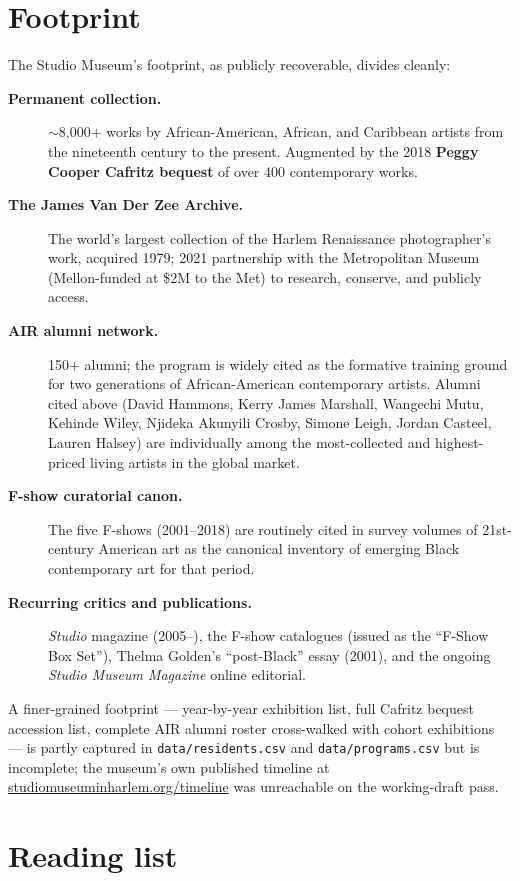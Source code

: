 \documentclass[10pt,letterpaper,twocolumn]{article}
\begin{document}
\section{Footprint}

The Studio Museum's footprint, as publicly recoverable, divides cleanly:

\begin{description}
\item[\textbf{Permanent collection.}] $\sim$8{,}000+ works by African-American, African, and Caribbean artists from the nineteenth century to the present. Augmented by the 2018 \textbf{Peggy Cooper Cafritz bequest} of over 400 contemporary works.
\item[\textbf{The James Van Der Zee Archive.}] The world's largest collection of the Harlem Renaissance photographer's work, acquired 1979; 2021 partnership with the Metropolitan Museum (Mellon-funded at \$2M to the Met) to research, conserve, and publicly access.
\item[\textbf{AIR alumni network.}] 150+ alumni; the program is widely cited as the formative training ground for two generations of African-American contemporary artists. Alumni cited above (David Hammons, Kerry James Marshall, Wangechi Mutu, Kehinde Wiley, Njideka Akunyili Crosby, Simone Leigh, Jordan Casteel, Lauren Halsey) are individually among the most-collected and highest-priced living artists in the global market.
\item[\textbf{F-show curatorial canon.}] The five F-shows (2001--2018) are routinely cited in survey volumes of 21st-century American art as the canonical inventory of emerging Black contemporary art for that period.
\item[\textbf{Recurring critics and publications.}] \emph{Studio} magazine (2005--), the F-show catalogues (issued as the ``F-Show Box Set''), Thelma Golden's ``post-Black'' essay (2001), and the ongoing \emph{Studio Museum Magazine} online editorial.
\end{description}

A finer-grained footprint --- year-by-year exhibition list, full Cafritz bequest accession list, complete AIR alumni roster cross-walked with cohort exhibitions --- is partly captured in \texttt{data/residents.csv} and \texttt{data/programs.csv} but is incomplete; the museum's own published timeline at \href{https://www.studiomuseuminharlem.org/timeline}{studiomuseuminharlem.org/timeline} was unreachable on the working-draft pass.

\section{Reading list}
\end{document}
